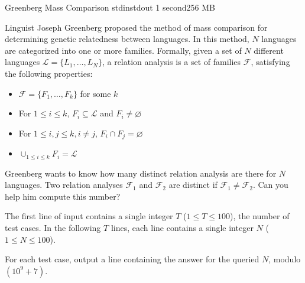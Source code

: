 \begin{problem}{Greenberg Mass Comparison}
{stdin}{stdout}
{1 second}{256 MB}{}

Linguist Joseph Greenberg proposed the method of mass comparison for determining genetic relatedness between languages. In this method, $N$ languages are categorized into one or more families. Formally, given a set of $N$ different languages $\mathcal{L} = \{L_1, \hdots, L_N\}$, a relation analysis is a set of families $\mathcal{F}$, satisfying the following properties:
\begin{itemize}
\item $\mathcal{F} = \{F_1, \hdots, F_k\}$ for some $k$
\item For $1 \le i \le k$, $F_i \subseteq \mathcal{L}$ and $F_i \ne \varnothing$
\item For $1 \le i,j \le k, i \ne j$, $F_i \cap F_j = \varnothing$
\item $\cup_{1 \le i \le k}{F_i} = \mathcal{L}$
\end{itemize}

Greenberg wants to know how many distinct relation analysis are there for $N$ languages. Two relation analyses $\mathcal{F}_1$ and $\mathcal{F}_2$ are distinct if $\mathcal{F}_1 \ne \mathcal{F}_2$. Can you help him compute this number?

\InputFile

The first line of input contains a single integer $T$ ($1 \le T \le 100$), the number of test cases.
In the following $T$ lines, each line contains a single integer $N$ ($1 \le N \le 100$).

\OutputFile

For each test case, output a line containing the answer for the queried $N$, modulo $(10^9+7)$.

\Examples

\begin{example}
%
\end{example}

\end{problem}
